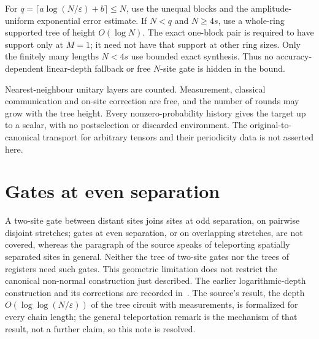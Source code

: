 \documentclass{article}
\begin{document}
For $q=\lceil a\log(N/\varepsilon)+b\rceil\le N$, use the unequal
blocks and the amplitude-uniform exponential error estimate. If $N<q$
and $N\ge4s$, use a whole-ring supported tree of height $O(\log N)$.
The exact one-block pair is required to have support only at $M=1$;
it need not have that support at other ring sizes. Only the finitely many
lengths $N<4s$ use bounded exact synthesis. Thus no accuracy-dependent
linear-depth fallback or free $N$-site gate is hidden in the bound.

Nearest-neighbour unitary layers are counted. Measurement, classical
communication and on-site correction are free, and the number of rounds
may grow with the tree height. Every nonzero-probability history gives the
target up to a scalar, with no postselection or discarded environment.
The original-to-canonical transport for arbitrary tensors and their
periodicity data is not asserted here.

\section{Gates at even separation}
A two-site gate between distant sites joins sites at odd separation, on pairwise
disjoint stretches; gates at even separation, or on overlapping stretches, are
not covered, whereas the paragraph of the source speaks of teleporting spatially
separated sites in general. Neither the tree of two-site gates nor the trees of
registers need such gates. This geometric limitation does not restrict the
canonical non-normal construction just described. The earlier
logarithmic-depth construction and its corrections are recorded
in~\cite{gap:mswc24_measurement_preparation_scope}.
The source's result, the depth $O(\log\log(N/\varepsilon))$ of the tree
circuit with measurements, is formalized for every chain length; the general
teleportation remark is the mechanism of that result, not a further claim, so
this note is resolved.



\end{document}

